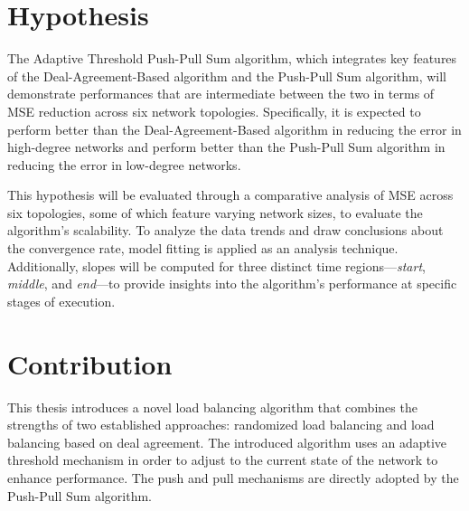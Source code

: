 \section{Hypothesis}\label{sec:hypothesis}
The Adaptive Threshold Push-Pull Sum algorithm, which integrates key features of the Deal-Agreement-Based algorithm and the Push-Pull Sum algorithm, will demonstrate performances that are intermediate between the two in terms of MSE reduction across six network topologies. Specifically, it is expected to perform better than the Deal-Agreement-Based algorithm in reducing the error in high-degree networks and perform better than the Push-Pull Sum algorithm in reducing the error in low-degree networks.

This hypothesis will be evaluated through a comparative analysis of MSE across six topologies, some of which feature varying network sizes, to evaluate the algorithm's scalability. To analyze the data trends and draw conclusions about the convergence rate, model fitting is applied as an analysis technique. Additionally, slopes will be computed for three distinct time regions—\textit{start}, \textit{middle}, and \textit{end}—to provide insights into the algorithm's performance at specific stages of execution.

\section{Contribution}\label{sec:contribution}
This thesis introduces a novel load balancing algorithm that combines the strengths of two established approaches: randomized load balancing and load balancing based on deal agreement. The introduced algorithm uses an adaptive threshold mechanism in order to adjust to the current state of the network to enhance performance. The push and pull mechanisms are directly adopted by the Push-Pull Sum algorithm.